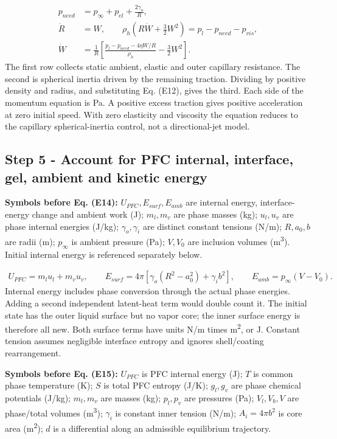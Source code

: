\documentclass[10pt,a4paper]{article}
\begin{document}
{\small\begin{align*}
p_{need}&=p_\infty+p_{el}+\frac{2\gamma_o}{R},\\
\dot R&=W,\qquad
\rho_h\left(R\dot W+\frac32W^2\right)=p_l-p_{need}-p_{vis},\\
\dot W&=\frac{1}{R}\left[\frac{p_l-p_{need}-4\eta W/R}{\rho_h}-\frac32W^2\right]. \tag{E13}
\end{align*}}
The first row collects static ambient, elastic and outer capillary resistance. The second is spherical inertia driven by the remaining traction. Dividing by positive density and radius, and substituting Eq. (E12), gives the third. Each side of the momentum equation is Pa. A positive excess traction gives positive acceleration at zero initial speed. With zero elasticity and viscosity the equation reduces to the capillary spherical-inertia control, not a directional-jet model.

\subsection*{Step 5  -  Account for PFC internal, interface, gel, ambient and kinetic energy}
\textbf{Symbols before Eq. (E14):} $U_{PFC},E_{surf},E_{amb}$ are internal energy, interface-energy change and ambient work (J); $m_l,m_v$ are phase masses (kg); $u_l,u_v$ are phase internal energies (J/kg); $\gamma_o,\gamma_i$ are distinct constant tensions (N/m); $R,a_0,b$ are radii (m); $p_\infty$ is ambient pressure (Pa); $V,V_0$ are inclusion volumes (m\textsuperscript{3}). Initial internal energy is referenced separately below.

{\small\begin{align*}
U_{PFC}=m_lu_l+m_vu_v,\qquad
E_{surf}=4\pi[\gamma_o(R^2-a_0^2)+\gamma_i b^2],\qquad
E_{amb}=p_\infty(V-V_0). \tag{E14}
\end{align*}}
Internal energy includes phase conversion through the actual phase energies. Adding a second independent latent-heat term would double count it. The initial state has the outer liquid surface but no vapor core; the inner surface energy is therefore all new. Both surface terms have units N/m times m\textsuperscript{2}, or J. Constant tension assumes negligible interface entropy and ignores shell/coating rearrangement.

\textbf{Symbols before Eq. (E15):} $U_{PFC}$ is PFC internal energy (J); $T$ is common phase temperature (K); $S$ is total PFC entropy (J/K); $g_l,g_v$ are phase chemical potentials (J/kg); $m_l,m_v$ are masses (kg); $p_l,p_v$ are pressures (Pa); $V_l,V_b,V$ are phase/total volumes (m\textsuperscript{3}); $\gamma_i$ is constant inner tension (N/m); $A_i=4\pi b^2$ is core area (m\textsuperscript{2}); $d$ is a differential along an admissible equilibrium trajectory.
\end{document}
